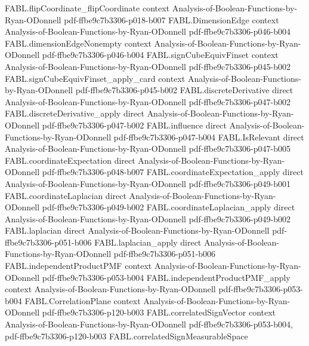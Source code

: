 \begin{theorem}
  {FABL.flipCoordinate_flipCoordinate}
  {context}
  {Analysis-of-Boolean-Functions-by-Ryan-ODonnell}
  {pdf-ffbe9c7b3306-p018-b007}
\proofstep
  {FABL.DimensionEdge}
  {context}
  {Analysis-of-Boolean-Functions-by-Ryan-ODonnell}
  {pdf-ffbe9c7b3306-p046-b004}
\proofstep
  {FABL.dimensionEdgeNonempty}
  {context}
  {Analysis-of-Boolean-Functions-by-Ryan-ODonnell}
  {pdf-ffbe9c7b3306-p046-b004}
\proofstep
  {FABL.signCubeEquivFinset}
  {context}
  {Analysis-of-Boolean-Functions-by-Ryan-ODonnell}
  {pdf-ffbe9c7b3306-p045-b002}
\proofstep
  {FABL.signCubeEquivFinset_apply_card}
  {context}
  {Analysis-of-Boolean-Functions-by-Ryan-ODonnell}
  {pdf-ffbe9c7b3306-p045-b002}
\proofstep
  {FABL.discreteDerivative}
  {direct}
  {Analysis-of-Boolean-Functions-by-Ryan-ODonnell}
  {pdf-ffbe9c7b3306-p047-b002}
\proofstep
  {FABL.discreteDerivative_apply}
  {direct}
  {Analysis-of-Boolean-Functions-by-Ryan-ODonnell}
  {pdf-ffbe9c7b3306-p047-b002}
\proofstep
  {FABL.influence}
  {direct}
  {Analysis-of-Boolean-Functions-by-Ryan-ODonnell}
  {pdf-ffbe9c7b3306-p047-b004}
\proofstep
  {FABL.IsRelevant}
  {direct}
  {Analysis-of-Boolean-Functions-by-Ryan-ODonnell}
  {pdf-ffbe9c7b3306-p047-b005}
\proofstep
  {FABL.coordinateExpectation}
  {direct}
  {Analysis-of-Boolean-Functions-by-Ryan-ODonnell}
  {pdf-ffbe9c7b3306-p048-b007}
\proofstep
  {FABL.coordinateExpectation_apply}
  {direct}
  {Analysis-of-Boolean-Functions-by-Ryan-ODonnell}
  {pdf-ffbe9c7b3306-p049-b001}
\proofstep
  {FABL.coordinateLaplacian}
  {direct}
  {Analysis-of-Boolean-Functions-by-Ryan-ODonnell}
  {pdf-ffbe9c7b3306-p049-b002}
\proofstep
  {FABL.coordinateLaplacian_apply}
  {direct}
  {Analysis-of-Boolean-Functions-by-Ryan-ODonnell}
  {pdf-ffbe9c7b3306-p049-b002}
\proofstep
  {FABL.laplacian}
  {direct}
  {Analysis-of-Boolean-Functions-by-Ryan-ODonnell}
  {pdf-ffbe9c7b3306-p051-b006}
\proofstep
  {FABL.laplacian_apply}
  {direct}
  {Analysis-of-Boolean-Functions-by-Ryan-ODonnell}
  {pdf-ffbe9c7b3306-p051-b006}
\proofstep
  {FABL.independentProductPMF}
  {context}
  {Analysis-of-Boolean-Functions-by-Ryan-ODonnell}
  {pdf-ffbe9c7b3306-p053-b004}
\proofstep
  {FABL.independentProductPMF_apply}
  {context}
  {Analysis-of-Boolean-Functions-by-Ryan-ODonnell}
  {pdf-ffbe9c7b3306-p053-b004}
\proofstep
  {FABL.CorrelationPlane}
  {context}
  {Analysis-of-Boolean-Functions-by-Ryan-ODonnell}
  {pdf-ffbe9c7b3306-p120-b003}
\proofstep
  {FABL.correlatedSignVector}
  {context}
  {Analysis-of-Boolean-Functions-by-Ryan-ODonnell}
  {pdf-ffbe9c7b3306-p053-b004,
    pdf-ffbe9c7b3306-p120-b003}
\proofstep
  {FABL.correlatedSignMeasurableSpace}

\end{theorem}
